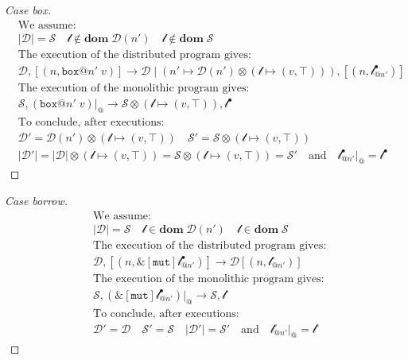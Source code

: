 \begin{proof}[Case box]
    \begin{align*}
    &\text{We assume:}\\
    &|\mathcal{D}| = \mathcal{S} \quad \mathscr{l} \notin \textbf{dom}\; \mathcal{D}(n') \quad \mathscr{l} \notin \textbf{dom}\; \mathcal{S}\\
    &\text{The execution of the distributed program gives:}\\
    &\mathcal{D}, [(n, \texttt{box}@n'\;v)] \longrightarrow \mathcal{D} \mid (n' \mapsto \mathcal{D}(n')\otimes(\mathscr{l} \mapsto (v, \top))), [(n, \mathscr{l}^\bullet_{@n'})]\\
    &\text{The execution of the monolithic program gives:}\\
    &\mathcal{S}, (\texttt{box}@n'\;v)|_@ \longrightarrow \mathcal{S} \otimes (\mathscr{l} \mapsto (v, \top)), \mathscr{l}^\bullet\\
    &\text{To conclude, after executions:}\\
    &\mathcal{D}' = \mathcal{D}(n')\otimes(\mathscr{l} \mapsto (v, \top)) \quad 
    \mathcal{S}' =  \mathcal{S} \otimes (\mathscr{l} \mapsto (v, \top))\\
    &|\mathcal{D}'| = |\mathcal{D}| \otimes (\mathscr{l} \mapsto (v, \top)) = \mathcal{S} \otimes (\mathscr{l} \mapsto (v, \top))= \mathcal{S}' \quad \text{and} \quad \mathscr{l}^\bullet_{@n'}|_@ = \mathscr{l}^\bullet
    \end{align*}
\end{proof}
\begin{proof}[Case borrow]
    \begin{align*}
    &\text{We assume:}\\
    &|\mathcal{D}| = \mathcal{S} \quad \mathscr{l} \in \textbf{dom}\; \mathcal{D}(n') \quad \mathscr{l} \in \textbf{dom}\; \mathcal{S}\\
    &\text{The execution of the distributed program gives:}\\
    &\mathcal{D}, [(n, \&[\texttt{mut}]\mathscr{l}^\bullet_{@n'})] \longrightarrow \mathcal{D} [(n, \mathscr{l}^\circ_{@n'})]\\
    &\text{The execution of the monolithic program gives:}\\
    &\mathcal{S}, (\&[\texttt{mut}]\mathscr{l}^\bullet_{@n'})|_@ \longrightarrow \mathcal{S}, \mathscr{l}^\circ\\
    &\text{To conclude, after executions:}\\
    &\mathcal{D}' = \mathcal{D}\quad 
    \mathcal{S}' =  \mathcal{S}\quad
    |\mathcal{D}'| = \mathcal{S}' \quad \text{and} \quad \mathscr{l}^\circ_{@n'}|_@ = \mathscr{l}^\circ
    \end{align*}
\end{proof}
